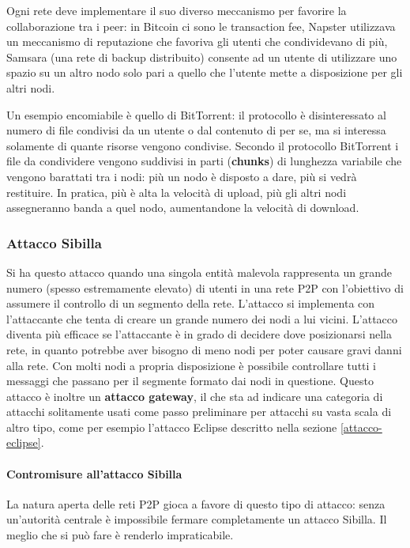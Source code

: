 Ogni rete deve implementare il suo diverso meccanismo per favorire la collaborazione tra i peer: in Bitcoin ci sono le transaction fee, Napster utilizzava un meccanismo di reputazione che favoriva gli utenti che condividevano di più, Samsara (una rete di backup distribuito) consente ad un utente di utilizzare uno spazio su un altro nodo solo pari a quello che l'utente mette a disposizione per gli altri nodi.

Un esempio encomiabile è quello di BitTorrent: il protocollo è disinteressato al numero di file condivisi da un utente o dal contenuto di per se, ma si interessa solamente di quante risorse vengono condivise. Secondo il protocollo BitTorrent i file da condividere vengono suddivisi in parti (\textbf{chunks}) di lunghezza variabile che vengono barattati tra i nodi: più un nodo è disposto a dare, più si vedrà restituire. In pratica, più è alta la velocità di upload, più gli altri nodi assegneranno banda a quel nodo, aumentandone la velocità di download.

\subsubsection{Attacco Sibilla}\label{attacco-sibilla}

Si ha questo attacco quando una singola entità malevola rappresenta un grande numero (spesso estremamente elevato) di utenti in una rete P2P con l'obiettivo di assumere il controllo di un segmento della rete. L'attacco si implementa con l'attaccante che tenta di creare un grande numero dei nodi a lui vicini. L'attacco diventa più efficace se l'attaccante è in grado di decidere dove posizionarsi nella rete, in quanto potrebbe aver bisogno di meno nodi per poter causare gravi danni alla rete. Con molti nodi a propria disposizione è possibile controllare tutti i messaggi che passano per il segmente formato dai nodi in questione. Questo attacco è inoltre un \textbf{attacco gateway}, il che sta ad indicare una categoria di attacchi solitamente usati come passo preliminare per attacchi su vasta scala di altro tipo, come per esempio l'attacco Eclipse descritto nella sezione \ref{attacco-eclipse}.

\paragraph{Contromisure all'attacco Sibilla}\label{contromisure-allattacco-sibilla}

La natura aperta delle reti P2P gioca a favore di questo tipo di attacco: senza un'autorità centrale è impossibile fermare completamente un attacco Sibilla. Il meglio che si può fare è renderlo impraticabile.

